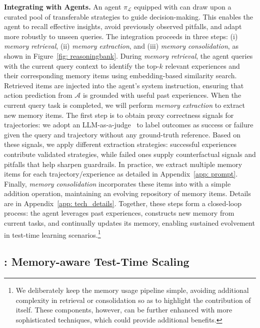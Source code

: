 \noindent\textbf{Integrating \ours{} with Agents.} 
An agent $\pi_{\mathcal{L}}$ equipped with \ours{} can draw upon a curated pool of transferable strategies to guide decision-making. This enables the agent to recall effective insights, avoid previously observed pitfalls, and adapt more robustly to unseen queries. 
The integration proceeds in three steps: (i) \textit{memory retrieval}, (ii) \textit{memory extraction}, and (iii) \textit{memory consolidation}, as shown in Figure~\ref{fig: reasoningbank}.
During \textit{memory retrieval}, the agent queries \ours{} with the current query context to identify the top-$k$ relevant experiences and their corresponding memory items using embedding-based similarity search. Retrieved items are injected into the agent’s system instruction, ensuring that action prediction from $\mathcal{A}$ is grounded with useful past experiences.
When the current query task is completed, we will perform \textit{memory extraction} to extract new memory items. The first step is to obtain proxy correctness signals for trajectories: we adopt an LLM-as-a-judge~\citep{gu2024survey} to label outcomes as success or failure given the query and trajectory without any ground-truth reference. Based on these signals, we apply different extraction strategies: successful experiences contribute validated strategies, while failed ones supply counterfactual signals and pitfalls that help sharpen guardrails. In practice, we extract multiple memory items for each trajectory/experience as detailed in Appendix~\ref{app: prompt}.
Finally, \textit{memory consolidation} incorporates these items into \ours{} with a simple addition operation, maintaining an evolving repository of memory items. Details are in Appendix~\ref{app: tech_details}.
Together, these steps form a closed-loop process: the agent leverages past experiences, constructs new memory from current tasks, and continually updates its memory, enabling sustained evolvement in test-time learning scenarios.\footnote{We deliberately keep the memory usage pipeline simple, avoiding additional complexity in retrieval or consolidation so as to highlight the contribution of \ours{} itself. These components, however, can be further enhanced with more sophisticated techniques, which could provide additional benefits.}


\subsection{\mats{}: Memory-aware Test-Time Scaling}\label{sec: tts}

